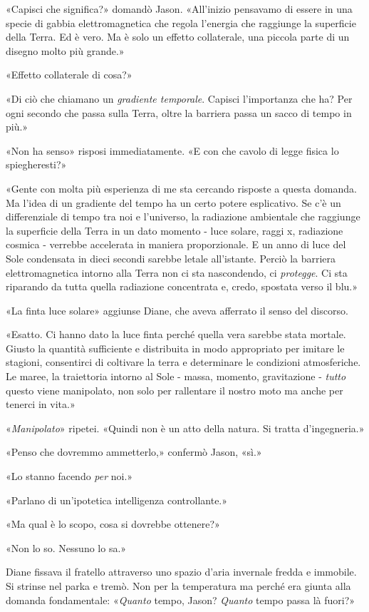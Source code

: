 «Capisci che significa?» domandò Jason. «All'inizio pensavamo di essere
in una specie di gabbia elettromagnetica che regola l'energia che
raggiunge la superficie della Terra. Ed è vero. Ma è solo un effetto
collaterale, una piccola parte di un disegno molto più grande.»

«Effetto collaterale di cosa?»

«Di ciò che chiamano un \emph{gradiente temporale}. Capisci l'importanza
che ha? Per ogni secondo che passa sulla Terra, oltre la barriera passa
un sacco di tempo in più.»

«Non ha senso» risposi immediatamente. «E con che cavolo di legge fisica
lo spiegheresti?»

«Gente con molta più esperienza di me sta cercando risposte a questa
domanda. Ma l'idea di un gradiente del tempo ha un certo potere
esplicativo. Se c'è un differenziale di tempo tra noi e l'universo, la
radiazione ambientale che raggiunge la superficie della Terra in un dato
momento - luce solare, raggi x, radiazione cosmica - verrebbe accelerata
in maniera proporzionale. E un anno di luce del Sole condensata in dieci
secondi sarebbe letale all'istante. Perciò la barriera elettromagnetica
intorno alla Terra non ci sta nascondendo, ci \emph{protegge}. Ci sta
riparando da tutta quella radiazione concentrata e, credo, spostata
verso il blu.»

«La finta luce solare» aggiunse Diane, che aveva afferrato il senso del
discorso.

«Esatto. Ci hanno dato la luce finta perché quella vera sarebbe stata
mortale. Giusto la quantità sufficiente e distribuita in modo
appropriato per imitare le stagioni, consentirci di coltivare la terra e
determinare le condizioni atmosferiche. Le maree, la traiettoria intorno
al Sole - massa, momento, gravitazione - \emph{tutto} questo viene
manipolato, non solo per rallentare il nostro moto ma anche per tenerci
in vita.»

«\emph{Manipolato}» ripetei. «Quindi non è un atto della natura. Si
tratta d'ingegneria.»

«Penso che dovremmo ammetterlo,» confermò Jason, «sì.»

«Lo stanno facendo \emph{per} noi.»

«Parlano di un'ipotetica intelligenza controllante.»

«Ma qual è lo scopo, cosa si dovrebbe ottenere?»

«Non lo so. Nessuno lo sa.»

Diane fissava il fratello attraverso uno spazio d'aria invernale fredda
e immobile. Si strinse nel parka e tremò. Non per la temperatura ma
perché era giunta alla domanda fondamentale: «\emph{Quanto} tempo,
Jason? \emph{Quanto} tempo passa là fuori?»

